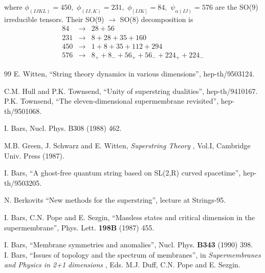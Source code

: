 where $\phi _{(IJKL)}=450,$ $\phi _{(IJ,K)}=231,\,\,\phi
_{[IJK]}=84,\,\,\psi _{\alpha (IJ)}=576$ are the SO(9) irreducible tensors.
Their SO(9) $\rightarrow $ SO(8) decomposition is
\begin{eqnarray}
84 &\rightarrow &28+56  \nonumber \\
231 &\rightarrow &8+28+35+160 \\
450 &\rightarrow &1+8+35+112+294  \nonumber \\
576 &\rightarrow &8_{+}+8_{-}+56_{+}+56_{-}+224_{+}+224_{-}  \nonumber
\end{eqnarray}


\begin{thebibliography}{99}
  E. Witten, ``String theory dynamics in various
dimensions'', hep-th/9503124.

  C.M. Hull and P.K. Townsend, ``Unity of superstring
dualities'', hep-th/9410167.
\\ P.K. Townsend, ``The eleven-dimensional
supermembrane revisited'', hep-th/9501068.


  I. Bars, Nucl. Phys. B308 (1988) 462.

  M.B. Green, J. Schwarz and E. Witten, {\it Superstring Theory}%
, Vol.I, Cambridge Univ. Press (1987).

  I. Bars, ``A ghost-free quantum string based on SL(2,R)
curved spacetime'', hep-th/9503205.

  N. Berkovits ``New methods for the superstring'', lecture at
Strings-95.

  I. Bars, C.N. Pope and E. Sezgin, ``Massless states and
critical dimension in the supermembrane'', Phys. Lett. {\bf 198B} (1987) 455.

  I. Bars, ``Membrane symmetries and anomalies'', Nucl.
Phys. {\bf B343} (1990) 398.\\ I. Bars, ``Issues of topology and the
spectrum of membranes'', in {\it Supermembranes and Physics in 2+1 dimensions%
}, Eds. M.J. Duff, C.N. Pope and E. Sezgin.



\end{thebibliography}


